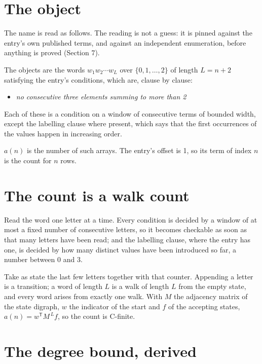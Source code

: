 \documentclass[11pt]{article}
\theoremstyle{definition}
\begin{document}
\section{The object}

The name is read as follows. The reading is not a guess: it is pinned against the entry's own published terms, and against an independent enumeration, before anything is proved (Section 7).

The objects are the words $w_1 w_2 \cdots w_L$ over $\{0,1,\dots,2\}$ of length $L = n + 2$ satisfying the entry's conditions, which are, clause by clause:

\begin{itemize}

\item {\itshape no consecutive three elements summing to more than 2}

\end{itemize}

Each of these is a condition on a window of consecutive terms of bounded width, except the labelling clause where present, which says that the first occurrences of the values happen in increasing order.

$a(n)$ is the number of such arrays. The entry's offset is 1, so its term of index $n$ is the count for $n$ rows.

\section{The count is a walk count}

Read the word one letter at a time. Every condition is decided by a window of at most a fixed number of consecutive letters, so it becomes checkable as soon as that many letters have been read; and the labelling clause, where the entry has one, is decided by how many distinct values have been introduced so far, a number between $0$ and 3.

Take as state the last few letters together with that counter. Appending a letter is a transition; a word of length $L$ is a walk of length $L$ from the empty state, and every word arises from exactly one walk. With $M$ the adjacency matrix of the state digraph, $w$ the indicator of the start and $f$ of the accepting states, $a(n) = w^{\mathsf T}M^{\,L}f$, so the count is C-finite.

\section{The degree bound, derived}
\end{document}
